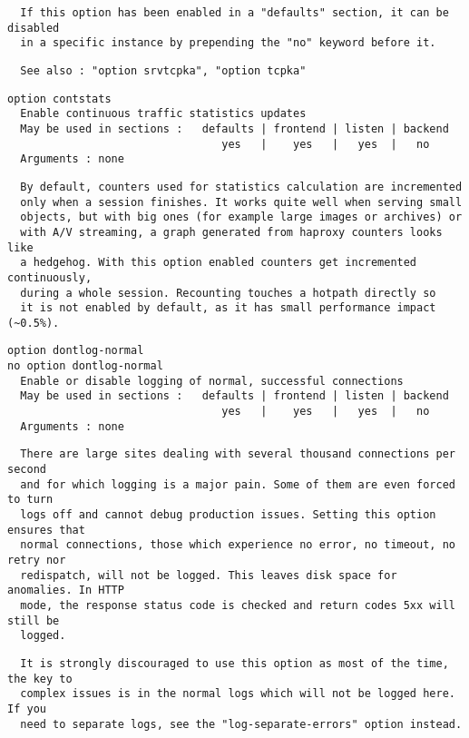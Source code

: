 \begin{verbatim}
  If this option has been enabled in a "defaults" section, it can be disabled
  in a specific instance by prepending the "no" keyword before it.
\end{verbatim}

\begin{verbatim}
  See also : "option srvtcpka", "option tcpka"
\end{verbatim}

\begin{verbatim}
option contstats
  Enable continuous traffic statistics updates
  May be used in sections :   defaults | frontend | listen | backend
                                 yes   |    yes   |   yes  |   no
  Arguments : none
\end{verbatim}

\begin{verbatim}
  By default, counters used for statistics calculation are incremented
  only when a session finishes. It works quite well when serving small
  objects, but with big ones (for example large images or archives) or
  with A/V streaming, a graph generated from haproxy counters looks like
  a hedgehog. With this option enabled counters get incremented continuously,
  during a whole session. Recounting touches a hotpath directly so
  it is not enabled by default, as it has small performance impact (~0.5%).
\end{verbatim}

\begin{verbatim}
option dontlog-normal
no option dontlog-normal
  Enable or disable logging of normal, successful connections
  May be used in sections :   defaults | frontend | listen | backend
                                 yes   |    yes   |   yes  |   no
  Arguments : none
\end{verbatim}

\begin{verbatim}
  There are large sites dealing with several thousand connections per second
  and for which logging is a major pain. Some of them are even forced to turn
  logs off and cannot debug production issues. Setting this option ensures that
  normal connections, those which experience no error, no timeout, no retry nor
  redispatch, will not be logged. This leaves disk space for anomalies. In HTTP
  mode, the response status code is checked and return codes 5xx will still be
  logged.
\end{verbatim}

\begin{verbatim}
  It is strongly discouraged to use this option as most of the time, the key to
  complex issues is in the normal logs which will not be logged here. If you
  need to separate logs, see the "log-separate-errors" option instead.
\end{verbatim}

